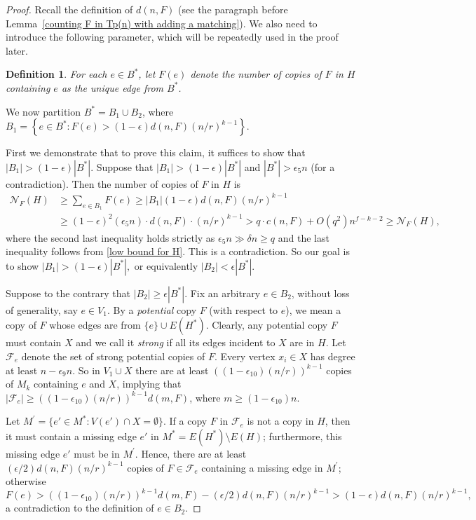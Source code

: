 \documentclass[10pt]{article}
\newtheorem{definition}[theorem]{Definition}
\begin{document}
\begin{proof}
Recall the definition of $d(n,F)$ (see the paragraph before Lemma~\ref{counting F in Tp(n) with adding a matching}).
We also need to introduce the following parameter, which will be repeatedly used in the proof later.
\begin{definition}\label{Def:F(e)}
For each $e\in B^*$, let $F(e)$ denote the number of copies of $F$ in $H$ containing $e$ as the unique edge from $B^*$.
\end{definition}
We now partition $B^\ast=B_1\cup B_2$, where $B_1=\left\{e\in B^\ast: F(e)>(1-\epsilon)d(n,F)(n/r)^{k-1}\right\}.$

First we demonstrate that to prove this claim, it suffices to show that $|B_1|>(1-\epsilon)|B^\ast|.$
Suppose that $|B_1|>(1-\epsilon)|B^\ast|$ and $|B^\ast|>\epsilon_5 n$ (for a contradiction).
Then the number of copies of $F$ in $H$ is
\begin{align*}
\mathcal{N}_F(H)&\geq  \sum_{e\in B_1}F(e)\geq |B_1|(1-\epsilon)d(n,F)(n/r)^{k-1}\\
&\geq(1-\epsilon)^2(\epsilon_5 n)\cdot d(n,F)\cdot (n/r)^{k-1} >q\cdot c(n,F)+O(q^2)n^{f-k-2}\geq \mathcal{N}_F(H),
\end{align*}
where the second last inequality holds strictly as $\epsilon_5 n\gg \delta n\geq q$ and the last inequality follows from \eqref{low bound for H}.
This is a contradiction.
So our goal is to show $|B_1|>(1-\epsilon)|B^\ast|,$ or equivalently $|B_2|<\epsilon |B^\ast|$.


Suppose to the contrary that $|B_2|\geq \epsilon |B^\ast|$.
Fix an arbitrary $e\in B_2$, without loss of generality, say $e\in V_1$.
By a {\it potential} copy $F$ (with respect to $e$), we mean a copy of $F$ whose edges are from $\{e\}\cup E(H^*)$.
Clearly, any potential copy $F$ must contain $X$ and we call it {\it strong} if all its edges incident to $X$ are in $H$.
Let $\mathcal{F}_e$ denote the set of strong potential copies of $F$.
Every vertex $x_i\in X$ has degree at least $n-\epsilon_9 n$.
So in $V_1\cup X$ there are at least $((1-\epsilon_{10})(n/r))^{k-1}$ copies of $M_k$ containing $e$ and $X$,
implying that $|\mathcal{F}_e|\geq ((1-\epsilon_{10})(n/r))^{k-1}d(m,F)$, where $m\geq (1-\epsilon_{10}) n$.

Let $M^\prime=\{e'\in M^*: V(e')\cap X=\emptyset\}$.
If a copy $F$ in $\mathcal{F}_e$ is not a copy in $H$, then it must contain a missing edge $e'$ in $M^*=E(H^*)\setminus E(H)$;
furthermore, this missing edge $e'$ must be in $M^\prime$.
Hence, there are at least $(\epsilon/2)d(n,F)(n/r)^{k-1}$ copies of $F\in \mathcal{F}_e$ containing a missing edge in $M^\prime$; otherwise
$$F(e)>((1-\epsilon_{10})(n/r))^{k-1}d(m,F)-(\epsilon/2)d(n,F)\left(n/r\right)^{k-1}>(1-\epsilon)d(n,F)\left(n/r\right)^{k-1},$$
a contradiction to the definition of $e\in B_2$.


\end{proof}
\end{document}
